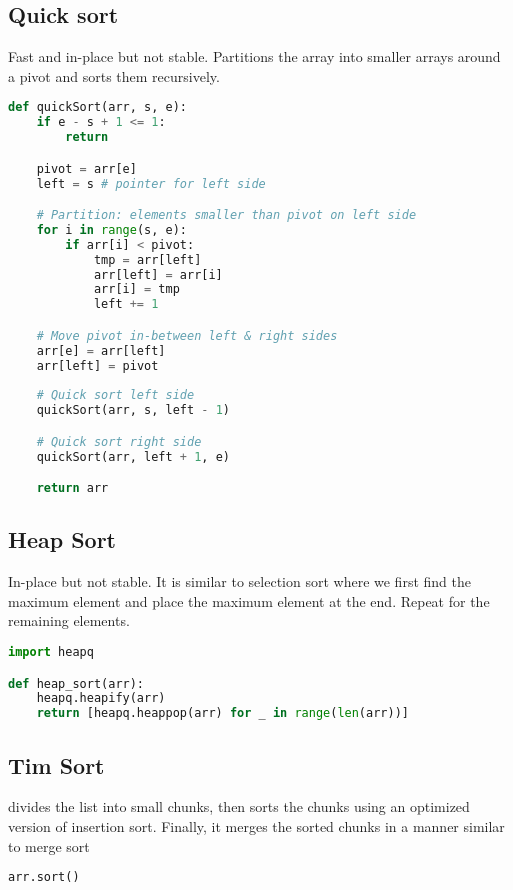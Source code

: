 \documentclass[english, threecolumn]{latex4ei/latex4ei_sheet}
\begin{document}
\begin{sectionbox}
\subsection{Quick sort}
Fast and in-place but not stable. Partitions the array into smaller arrays around a pivot and sorts them recursively.
\begin{lstlisting}[language=python, gobble=0]
def quickSort(arr, s, e):
    if e - s + 1 <= 1:
        return

    pivot = arr[e]
    left = s # pointer for left side

    # Partition: elements smaller than pivot on left side
    for i in range(s, e):
        if arr[i] < pivot:
            tmp = arr[left]
            arr[left] = arr[i]
            arr[i] = tmp
            left += 1

    # Move pivot in-between left & right sides
    arr[e] = arr[left]
    arr[left] = pivot
    
    # Quick sort left side
    quickSort(arr, s, left - 1)

    # Quick sort right side
    quickSort(arr, left + 1, e)

    return arr
\end{lstlisting}
\end{sectionbox}

\begin{sectionbox}
\subsection{Heap Sort}
In-place but not stable. It is similar to selection sort where we first find the maximum element and place the maximum element at the end. Repeat  for the remaining elements.
\begin{lstlisting}[language=python, gobble=0]
import heapq

def heap_sort(arr):
    heapq.heapify(arr)
    return [heapq.heappop(arr) for _ in range(len(arr))]
\end{lstlisting}
\end{sectionbox}

\begin{sectionbox}
\subsection{Tim Sort}
divides the list into small chunks, then sorts the chunks using an optimized version of insertion sort. Finally, it merges the sorted chunks in a manner similar to merge sort
\begin{lstlisting}[language=python, gobble=0]
arr.sort()
\end{lstlisting}
\end{sectionbox}
\end{document}
